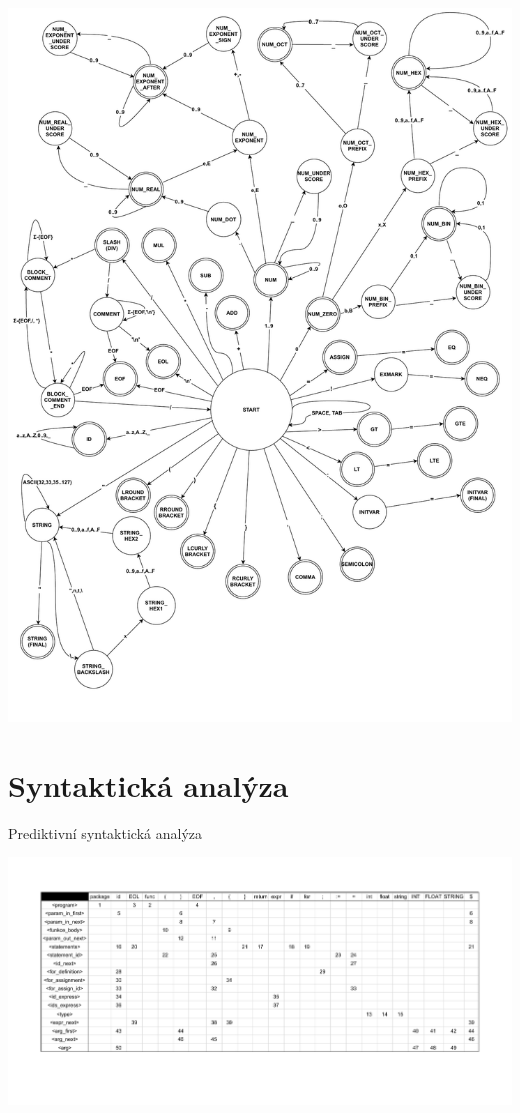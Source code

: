 \documentclass[a4paper, 12pt]{article}
\begin{document}
\includegraphics[width=\textwidth,height=\textheight,keepaspectratio]{Scanner_FSM_Graph.pdf}

\newpage

\section{Syntaktická analýza}
Prediktivní syntaktická analýza
    
\includegraphics[width=\textwidth,keepaspectratio]{LL_table.pdf}
\end{document}
